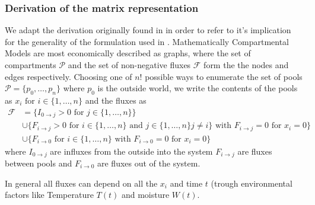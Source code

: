 \documentclass[journal abbreviation, manuscript]{copernicus}
\theoremstyle{definition}
\newcommand{\X}{\mathbf{X}}
\begin{document}
\subsubsection{Derivation of the matrix representation} 
We adapt the derivation originally found in \citep{Jacquez1972} in order to refer to it's implication for the generality of the formulation used in \citep{Luo2017Biogeosciences}.
Mathematically Compartmental Models are most economically described as graphs, where the set of compartments $\mathcal{P}$ and the set of non-negative fluxes $\mathcal{F}$ form the the nodes and edges respectively. 
Choosing one of $n!$ possible ways to enumerate  the set of pools $\mathcal{P}=\{p_0,\dots,p_n\}$ where $p_0$ is the outside world, we write the contents of the pools as $x_i \text{ for } i \in \{1,\dots,n\} $ and the fluxes as
\begin{align*}
\mathcal{F} &=
\{
I_{0 \rightarrow j} > 0
\text{ for } j \in \{1,\dots ,n\}
\}  
\\
&
\cup
\{
F_{i \rightarrow j} > 0
\text{ for } i \in \{1,\dots ,n\} 
\text{ and } j \in \{1,\dots ,n\} j\ne i
\}
\text{ with }
F_{i \rightarrow j}=0 \text{ for }  x_{i} = 0 
\}
\\
&
\cup
\{
F_{i \rightarrow 0} 
\text{ for } i \in \{1,\dots ,n\} 
\text{ with }
F_{i \rightarrow 0}=0 \text{ for }  x_{i} = 0 
\}
\end{align*}
\label{massbalance} 
where 
$ 
I_{0 \rightarrow j} 
$
are influxes from the outside into the system 
$
F_{i \rightarrow j} 
$
are fluxes between pools 
and 
$
F_{i \rightarrow 0} 
$
are fluxes out of the system.

In general all fluxes can depend on all the $x_i$  and time $t$ (trough environmental factors like  Temperature $T(t)$ and moisture $W(t)$.
\end{document}
